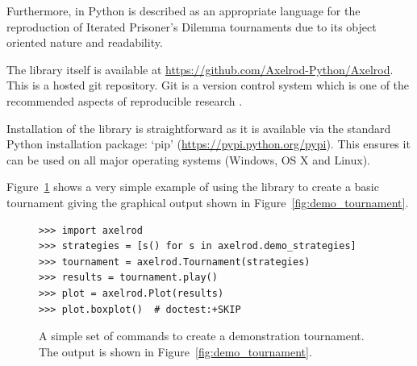 \documentclass{article}
\begin{document}
Furthermore, in \cite{Isaac2008} Python is described as an appropriate language for the
reproduction of Iterated Prisoner's Dilemma tournaments due to its object
oriented nature and readability.

The library itself is available at
\url{https://github.com/Axelrod-Python/Axelrod}. This is a hosted git
repository. Git is a version control system which is one of the
recommended aspects of reproducible research \cite{Crick2014a, Sandve2013}.

Installation of the library is straightforward as it is available via the
standard Python installation package: `pip'
(\url{https://pypi.python.org/pypi}). This ensures it can be used on all major
operating systems (Windows, OS X and Linux).

Figure~\ref{fig:demo_tournament_commands} shows a very simple example of using
the library to create a basic tournament giving the graphical output shown in
Figure~\ref{fig:demo_tournament}.

\begin{figure}[!hbtp]
    \begin{verbatim}
>>> import axelrod
>>> strategies = [s() for s in axelrod.demo_strategies]
>>> tournament = axelrod.Tournament(strategies)
>>> results = tournament.play()
>>> plot = axelrod.Plot(results)
>>> plot.boxplot()  # doctest:+SKIP
    \end{verbatim}
    \caption{A simple set of commands to create a demonstration tournament. The
        output is shown in Figure~\ref{fig:demo_tournament}.}
    \label{fig:demo_tournament_commands}
\end{figure}
\end{document}
